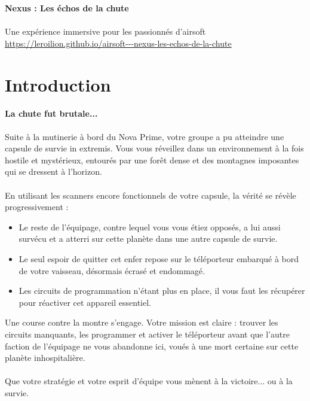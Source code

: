 \documentclass{template}
\begin{document}
\begin{titlepage}
    \centering
    \vspace*{0.5in}
    {\Huge \textbf{Nexus : Les échos de la chute}}\\

    \vspace{0.5in}
    \\[1cm]
    \vspace{0.5in}
    {\Large Une expérience immersive pour les passionnés d'airsoft}
    {\large \url{https://leroilion.github.io/airsoft---nexus-les-echos-de-la-chute}}
\end{titlepage}

\section{Introduction}

\textbf{La chute fut brutale...} \\ \\
Suite à la mutinerie à bord du Nova Prime, votre groupe a pu atteindre une capsule de survie in extremis. Vous vous réveillez dans un environnement à la fois hostile et mystérieux, entourés par une forêt dense et des montagnes imposantes qui se dressent à l'horizon.
\\ \\
En utilisant les scanners encore fonctionnels de votre capsule, la vérité se révèle progressivement :
\begin{itemize}
    \item Le reste de l'équipage, contre lequel vous vous étiez opposés, a lui aussi survécu et a atterri sur cette planète dans une autre capsule de survie.
    \item Le seul espoir de quitter cet enfer repose sur le téléporteur embarqué à bord de votre vaisseau, désormais écrasé et endommagé.
    \item Les circuits de programmation n'étant plus en place, il vous faut les récupérer pour réactiver cet appareil essentiel.
\end{itemize}
Une course contre la montre s'engage. Votre mission est claire : trouver les circuits manquants, les programmer et activer le téléporteur avant que l'autre faction de l'équipage ne vous abandonne ici, voués à une mort certaine sur cette planète inhospitalière.\\
\\
Que votre stratégie et votre esprit d'équipe vous mènent à la victoire... ou à la survie.
\end{document}

